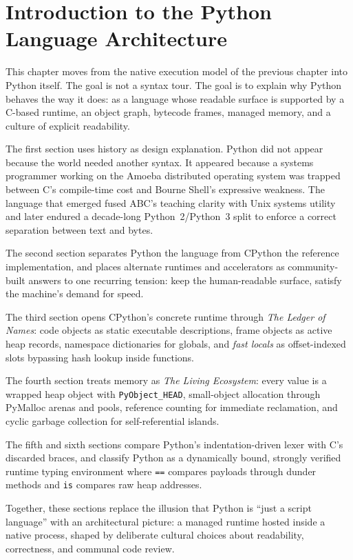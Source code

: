 \chapter{Introduction to the Python Language Architecture}

This chapter moves from the native execution model of the previous chapter into Python itself. The goal is not a syntax tour. The goal is to explain why Python behaves the way it does: as a language whose readable surface is supported by a C-based runtime, an object graph, bytecode frames, managed memory, and a culture of explicit readability.

The first section uses history as design explanation. Python did not appear because the world needed another syntax. It appeared because a systems programmer working on the Amoeba distributed operating system was trapped between C's compile-time cost and Bourne Shell's expressive weakness. The language that emerged fused ABC's teaching clarity with Unix systems utility and later endured a decade-long Python~2/Python~3 split to enforce a correct separation between text and bytes.

The second section separates Python the language from CPython the reference implementation, and places alternate runtimes and accelerators as community-built answers to one recurring tension: keep the human-readable surface, satisfy the machine's demand for speed.

The third section opens CPython's concrete runtime through \emph{The Ledger of Names}: code objects as static executable descriptions, frame objects as active heap records, namespace dictionaries for globals, and \emph{fast locals} as offset-indexed slots bypassing hash lookup inside functions.

The fourth section treats memory as \emph{The Living Ecosystem}: every value is a wrapped heap object with \texttt{PyObject\_HEAD}, small-object allocation through PyMalloc arenas and pools, reference counting for immediate reclamation, and cyclic garbage collection for self-referential islands.

The fifth and sixth sections compare Python's indentation-driven lexer with C's discarded braces, and classify Python as a dynamically bound, strongly verified runtime typing environment where \texttt{==} compares payloads through dunder methods and \texttt{is} compares raw heap addresses.

Together, these sections replace the illusion that Python is ``just a script language'' with an architectural picture: a managed runtime hosted inside a native process, shaped by deliberate cultural choices about readability, correctness, and communal code review.
